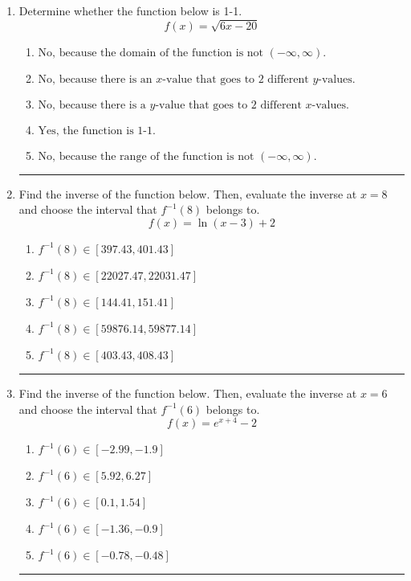 \documentclass[14pt]{extbook}
\newcommand{\litem}[1]{\item#1\hspace*{-1cm}\rule{\textwidth}{0.4pt}}
\begin{document}
\begin{enumerate}
{\begin{enumerate}[label=\Alph*.]
\end{enumerate} }
\litem{
Determine whether the function below is 1-1.\[ f(x) = \sqrt{6 x - 20} \]\begin{enumerate}[label=\Alph*.]
\item \( \text{No, because the domain of the function is not $(-\infty, \infty)$.} \)
\item \( \text{No, because there is an $x$-value that goes to 2 different $y$-values.} \)
\item \( \text{No, because there is a $y$-value that goes to 2 different $x$-values.} \)
\item \( \text{Yes, the function is 1-1.} \)
\item \( \text{No, because the range of the function is not $(-\infty, \infty)$.} \)

\end{enumerate} }
\litem{
Find the inverse of the function below. Then, evaluate the inverse at $x = 8$ and choose the interval that $f^{-1}(8)$ belongs to.\[ f(x) = \ln{(x-3)}+2 \]\begin{enumerate}[label=\Alph*.]
\item \( f^{-1}(8) \in [397.43, 401.43] \)
\item \( f^{-1}(8) \in [22027.47, 22031.47] \)
\item \( f^{-1}(8) \in [144.41, 151.41] \)
\item \( f^{-1}(8) \in [59876.14, 59877.14] \)
\item \( f^{-1}(8) \in [403.43, 408.43] \)

\end{enumerate} }
\litem{
Find the inverse of the function below. Then, evaluate the inverse at $x = 6$ and choose the interval that $f^{-1}(6)$ belongs to.\[ f(x) = e^{x+4}-2 \]\begin{enumerate}[label=\Alph*.]
\item \( f^{-1}(6) \in [-2.99, -1.9] \)
\item \( f^{-1}(6) \in [5.92, 6.27] \)
\item \( f^{-1}(6) \in [0.1, 1.54] \)
\item \( f^{-1}(6) \in [-1.36, -0.9] \)
\item \( f^{-1}(6) \in [-0.78, -0.48] \)


\end{enumerate}}
\end{enumerate}
\end{document}

